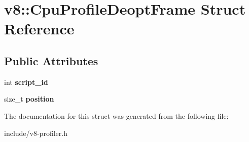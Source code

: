 \hypertarget{structv8_1_1_cpu_profile_deopt_frame}{}\section{v8\+:\+:Cpu\+Profile\+Deopt\+Frame Struct Reference}
\label{structv8_1_1_cpu_profile_deopt_frame}
\subsection*{Public Attributes}
\begin{DoxyCompactItemize}
\item 
int {\bfseries script\+\_\+id}\hypertarget{structv8_1_1_cpu_profile_deopt_frame_af7b750288458a70a81b4c05869b8f6d7}{}\label{structv8_1_1_cpu_profile_deopt_frame_af7b750288458a70a81b4c05869b8f6d7}

\item 
size\+\_\+t {\bfseries position}\hypertarget{structv8_1_1_cpu_profile_deopt_frame_a4f82d1517fd15573bb2890961496a76f}{}\label{structv8_1_1_cpu_profile_deopt_frame_a4f82d1517fd15573bb2890961496a76f}

\end{DoxyCompactItemize}


The documentation for this struct was generated from the following file\+:\begin{DoxyCompactItemize}
\item 
include/v8-\/profiler.\+h\end{DoxyCompactItemize}
